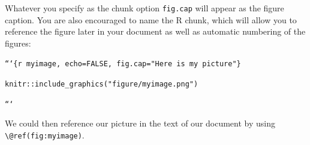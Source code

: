 \documentclass[]{tufte-book}
\begin{document}
Whatever you specify as the chunk option \texttt{fig.cap} will appear as
the figure caption. You are also encouraged to name the R chunk, which
will allow you to reference the figure later in your document as well as
automatic numbering of the figures:

\texttt{```\{r\ myimage,\ echo=FALSE,\ fig.cap="Here\ is\ my\ picture"\}}

\texttt{knitr::include\_graphics("figure/myimage.png")}

\texttt{```}

We could then reference our picture in the text of our document by using
\texttt{\textbackslash{}@ref(fig:myimage)}.


\end{document}
